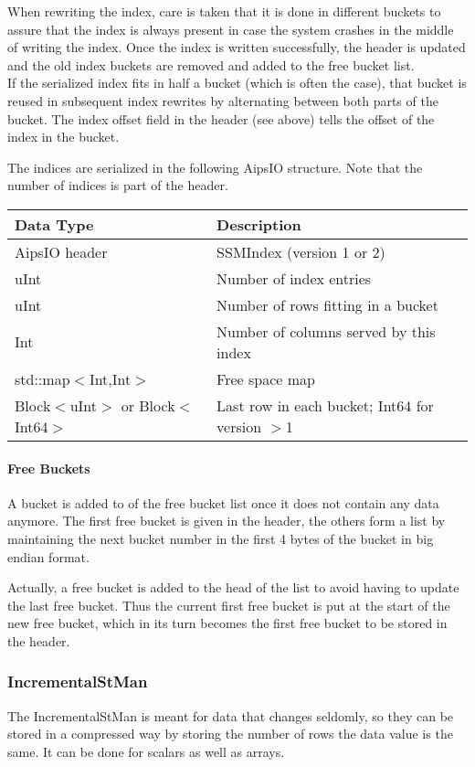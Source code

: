 When rewriting the index, care is taken that it is done in
different buckets to assure that the index is always present in case
the system crashes in the middle of writing the index. Once the index
is written successfully, the header is updated and the old index
  buckets are removed and added to the free bucket list.
\\If the serialized index fits in half a bucket (which is often the
case), that bucket is reused in subsequent index rewrites
by alternating between both parts of the bucket. The index offset
field in the header (see above) tells the offset of the index in the bucket.

The indices are serialized in the following AipsIO structure. Note
  that the number of indices is part of the header.

\vspace{0.15in}
\begin{tabular}{|l|p{13cm}|} \hline
  Data Type & Description \\ \hline\hline
  AipsIO header & SSMIndex (version 1 or 2) \\
  uInt & Number of index entries \\
  uInt & Number of rows fitting in a bucket \\
  Int & Number of columns served by this index \\
  std::map$<$Int,Int$>$ & Free space map \\
  Block$<$uInt$>$ or Block$<$Int64$>$ & Last row in each bucket; Int64 for version $>$1 \\
  \hline
\end{tabular}
\vspace{0.15in}

\paragraph{Free Buckets\\}
A bucket is added to of the free bucket list once it does not contain any
  data anymore.
The first free bucket is given in the header, the others form a list
  by maintaining the next bucket number in the first 4 bytes of the
  bucket in big endian format.

Actually, a free bucket is added to the head of the list to avoid having to update
  the last free bucket. Thus the current first free bucket is put at
  the start of the new free bucket, which in its turn becomes the
  first free bucket to be stored in the header.


\subsubsection{\label{CTDS:INCREMENTALSTMAN}IncrementalStMan}
The IncrementalStMan is meant for data that changes seldomly, so they
can be stored in a compressed way by storing the number of rows the
data value is the same. It can be done for scalars as well as arrays.

